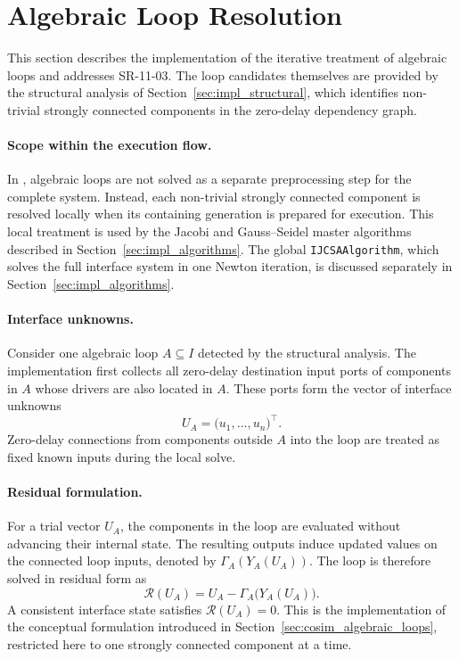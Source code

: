 \section{Algebraic Loop Resolution}
\label{sec:impl_algebraic_loops}

This section describes the implementation of the iterative treatment of algebraic loops and addresses SR-11-03.
The loop candidates themselves are provided by the structural analysis of Section~\ref{sec:impl_structural}, which identifies non-trivial strongly connected components in the zero-delay dependency graph.

\paragraph{Scope within the execution flow.}
In \syssimx{}, algebraic loops are not solved as a separate preprocessing step for the complete system.
Instead, each non-trivial strongly connected component is resolved locally when its containing generation is prepared for execution.
This local treatment is used by the Jacobi and Gauss--Seidel master algorithms described in Section~\ref{sec:impl_algorithms}.
The global \texttt{IJCSAAlgorithm}, which solves the full interface system in one Newton iteration, is discussed separately in Section~\ref{sec:impl_algorithms}.

\paragraph{Interface unknowns.}
Consider one algebraic loop $A \subseteq I$ detected by the structural analysis.
The implementation first collects all zero-delay destination input ports of components in $A$ whose drivers are also located in $A$.
These ports form the vector of interface unknowns
\begin{equation}
    U_A = \bigl(u_1,\ldots,u_n\bigr)^\top.
\end{equation}
Zero-delay connections from components outside $A$ into the loop are treated as fixed known inputs during the local solve.

\paragraph{Residual formulation.}
For a trial vector $U_A$, the components in the loop are evaluated without advancing their internal state.
The resulting outputs induce updated values on the connected loop inputs, denoted by $\Gamma_A(Y_A(U_A))$.
The loop is therefore solved in residual form as
\begin{equation}
    \mathcal{R}(U_A) = U_A - \Gamma_A\!\bigl(Y_A(U_A)\bigr).
\end{equation}
A consistent interface state satisfies $\mathcal{R}(U_A)=0$.
This is the implementation of the conceptual formulation introduced in Section~\ref{sec:cosim_algebraic_loops}, restricted here to one strongly connected component at a time.

